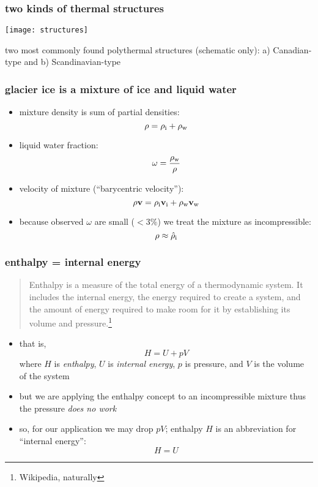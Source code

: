 \documentclass{beamer}
\begin{document}
\begin{frame}
  \frametitle{two kinds of thermal structures}

\vspace{-1cm}
  \begin{center}
    \texttt{[image: structures]}
  \end{center}

\scriptsize two most commonly found polythermal structures (schematic only): a) Canadian-type and b) Scandinavian-type\small

\end{frame}


\begin{frame}
  \frametitle{glacier ice is a mixture of ice and liquid water}

\begin{itemize}
\item mixture density is sum of partial densities:
\begin{equation}
  \rho = \rho_{\text i} +  \rho_{\text w}\notag
\end{equation} 
\item liquid water fraction:
\begin{equation}
  \omega = \frac{\rho_{\text w}}{\rho} \notag
\end{equation}
\item velocity of mixture (``barycentric velocity''):
\begin{equation}
  \rho \mathbf{v} = \rho_{\text i} \mathbf{v}_{\text i} + \rho_{\text w} \mathbf{v}_{\text w} \notag
\end{equation} 
\item because observed $\omega$ are small ($< 3 \%$) we treat the mixture as incompressible:
  $$\rho \approx \hat \rho_{\text i}$$
\end{itemize}
\end{frame}


\begin{frame}
  \frametitle{enthalpy = internal energy}
\small
  
\begin{quote}
Enthalpy is a measure of the total energy of a thermodynamic system.  It includes the internal energy, the energy required to create a system, and the amount of energy required to make room for it by establishing its volume and pressure.\footnote{\tiny Wikipedia, naturally}
\end{quote}
\begin{itemize}
\item that is,
	$$H = U + p V$$
where $H$ is \emph{enthalpy}, $U$ is \emph{internal energy}, $p$ is pressure, and $V$ is the volume of the system
\item but we are applying the enthalpy concept to an incompressible mixture thus the pressure \emph{does no work}
\item so, for our application we may drop $pV$; enthalpy $H$ is an abbreviation for ``internal energy'':
	$$H = U$$
\end{itemize}
\end{frame}
\end{document}
